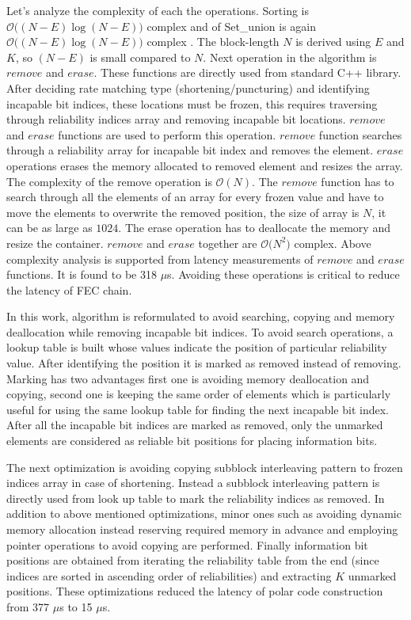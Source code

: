 Let's analyze the complexity of each the operations. Sorting is $\mathcal{O}\big((N-E)\log{}(N-E)\big)$ complex and of Set\_union is again $\mathcal{O}\big((N-E)\log{}(N-E)\big)$ complex \cite{cppStd}. The block-length $N$ is derived using $E$ and $K$, so $(N-E)$ is small compared to $N$. Next operation in the algorithm is $remove$ and $erase$. These functions are directly used from standard C++ library. After deciding rate matching type (shortening/puncturing) and identifying incapable bit indices, these locations must be frozen, this requires traversing through reliability indices array and removing incapable bit locations. $remove$ and $erase$ functions are used to perform this operation. $remove$ function searches through a reliability array for incapable bit index and removes the element. $erase$ operations erases the memory allocated to removed element and resizes the array. The complexity of the remove operation is $\mathcal{O}(N)$. The $remove$ function has to search through all the elements of an array for every frozen value and have to move the elements to overwrite the removed position, the size of array is $N$, it can be as large as $1024$. The erase operation has to deallocate the memory and resize the container. $remove$ and $erase$ together are $\mathcal{O}\big(N^2\big)$ complex. Above complexity analysis is supported from latency measurements of $remove$ and $erase$ functions. It is found to be 318 $\mu$s. Avoiding these operations is critical to reduce the latency of FEC chain. \newline

In this work, algorithm is reformulated to avoid searching, copying and memory deallocation while removing incapable bit indices. To avoid search operations, a lookup table is built whose values indicate the position of particular reliability value. After identifying the position it is marked as removed instead of removing. Marking has two advantages first one is avoiding memory deallocation and copying, second one is keeping the same order of elements which is particularly useful for using the same lookup table for finding the next incapable bit index. After all the incapable bit indices are marked as removed, only the unmarked elements are considered as reliable bit positions for placing information bits.


The next optimization is avoiding copying subblock interleaving pattern to frozen indices array in case of shortening. Instead a subblock interleaving pattern is directly used from look up table to mark the reliability indices as removed. In addition to above mentioned optimizations, minor ones such as avoiding dynamic memory allocation instead reserving required memory in advance and employing pointer operations to avoid copying are performed. Finally information bit positions are obtained from iterating the reliability table from the end (since indices are sorted in ascending order of reliabilities) and extracting $K$ unmarked positions. These optimizations reduced the latency of polar code construction from 377 $\mu$s to 15 $\mu$s.

